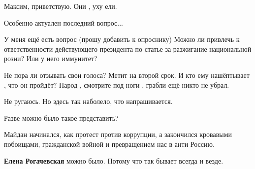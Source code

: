 \begin{itemize}
Максим, приветствую. Они , уху ели.

 
Особенно актуален последний вопрос...

 

У меня ещё есть вопрос (прошу добавить к опроснику) Можно ли привлечь к
ответственности действующего президента по статье за разжигание национальной
розни? Или у него иммунитет?


 

Не пора ли отзывать свои голоса? Метит на второй срок. И кто ему нашёптывает ,
что он пройдёт? Народ , смотрите под ноги , грабли ещё никто не убрал.

 

Не ругаюсь. Но здесь так наболело, что напрашивается.

Разве можно было такое представить?

Майдан начинался, как протест против коррупции, а закончился кровавыми
побоищами, гражданской войной и превращением нас в анти Россию.

\begin{itemize}
 
\textbf{Елена Рогачевская} можно было. Потому что так бывает всегда и везде.


\end{itemize}
\end{itemize}
